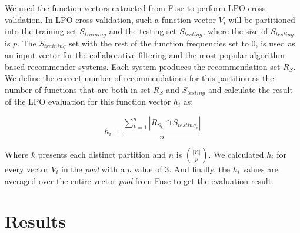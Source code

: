 \documentclass{article} %
\begin{document}
We used the function vectors extracted from Fuse to perform LPO cross validation. In LPO cross validation, such a function vector $V_i$ will be partitioned into the training set $S_{training}$ and the testing set $S_{testing}$, where the size of $S_{testing}$ is $p$. The $S_{training}$ set with the rest of the function frequencies set to 0, is used as an input vector for the collaborative filtering and the most popular algorithm based recommender systems. Each system produces the recommendation set $R_S$. We define the correct number of recommendations for this partition as the number of functions that are both in set $R_S$ and $S_{testing}$ and calculate the result of the LPO evaluation for this function vector $h_i$ as:

\begin{center}
	\[
	h_i = \frac{\sum\limits_{k=1}^{n} |R_{S_k} \cap S_{{testing}_k}|}{n}
	\]
\end{center}

Where $k$ presents each distinct partition and $n$ is $|V_i|\choose p$. We calculated $h_i$ for every vector $V_i$ in the \textit{pool} with a $p$ value of 3. And finally, the $h_i$ values are averaged over the entire vector \textit{pool} from Fuse to get the evaluation result.

\section{Results}



\end{document}
